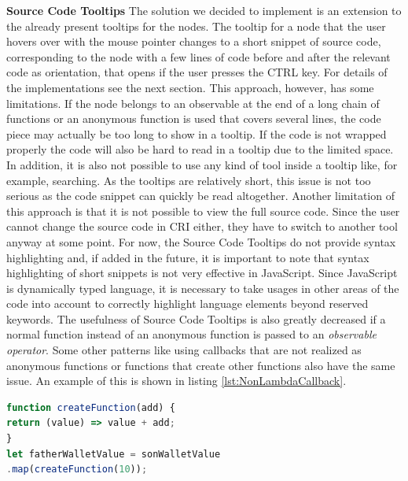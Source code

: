 \textbf{Source Code Tooltips}
The solution we decided to implement is an extension to the already present tooltips for the nodes. The tooltip for a node that the user hovers over with the mouse pointer changes to a short snippet of source code, corresponding to the node with a few lines of code before and after the relevant code as orientation, that opens if the user presses the CTRL key. For details of the implementations see the next section. This approach, however, has some limitations. If the node belongs to an observable at the end of a long chain of functions or an anonymous function is used that covers several lines, the code piece may actually be too long to show in a tooltip. If the code is not wrapped properly the code will also be hard to read in a tooltip due to the limited space. In addition, it is also not possible to use any kind of tool inside a tooltip like, for example, searching. As the tooltips are relatively short, this issue is not too serious as the code snippet can quickly be read altogether. Another limitation of this approach is that it is not possible to view the full source code. Since the user cannot change the source code in CRI either, they have to switch to another tool anyway at some point. For now, the Source Code Tooltips do not provide syntax highlighting and, if added in the future, it is important to note that syntax highlighting of short snippets is not very effective in JavaScript. Since JavaScript is dynamically typed language, it is necessary to take usages in other areas of the code into account to correctly highlight language elements beyond reserved keywords. The usefulness of Source Code Tooltips is also greatly decreased if a normal function instead of an anonymous function is passed to an \emph{observable operator}. Some other patterns like using callbacks that are not realized as anonymous functions or functions that create other functions also have the same issue. An example of this is shown in listing \ref{lst:NonLambdaCallback}.

\begin{lstlisting}[language=JavaScript, caption={Example of using a creation function in RxJS.},label={lst:NonLambdaCallback}]
function createFunction(add) {
return (value) => value + add;
}
let fatherWalletValue = sonWalletValue
.map(createFunction(10));
\end{lstlisting}

